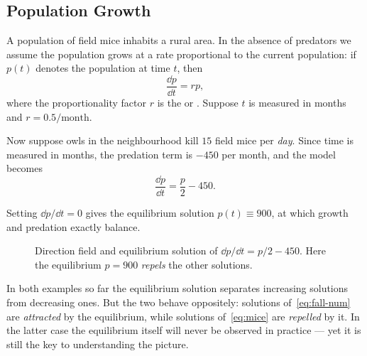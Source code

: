 \subsection{Population Growth}

\begin{eg}
	A population of field mice inhabits a rural area. In the absence of predators we
	assume the population grows at a rate proportional to the current population: if
	\(p(t)\) denotes the population at time \(t\), then
	\begin{equation}\label{eq:mice-basic}
		\frac{\dd p}{\dd t} = r p,
	\end{equation}
	where the proportionality factor \(r\) is the  or . Suppose \(t\) is measured in months and \(r = 0.5/\text{month}\).

	Now suppose owls in the neighbourhood kill \(15\) field mice per \emph{day}. Since
	time is measured in months, the predation term is \(-450\) per month, and the model
	becomes
	\begin{equation}\label{eq:mice}
		\frac{\dd p}{\dd t} = \frac{p}{2} - 450.
	\end{equation}
\end{eg}

Setting \(\dd p/\dd t = 0\) gives the equilibrium solution \(p(t) \equiv 900\), at which
growth and predation exactly balance.

\begin{figure}[H]
	\centering
	\caption{Direction field and equilibrium solution of
		\(\dd p/\dd t = p/2 - 450\). Here the equilibrium \(p = 900\) \emph{repels} the
		other solutions.}
	\label{fig:dirfield-mice}
\end{figure}

\begin{moral}
	In both examples so far the equilibrium solution separates increasing solutions from
	decreasing ones. But the two behave oppositely: solutions of~\eqref{eq:fall-num} are
	\emph{attracted} by the equilibrium, while solutions of~\eqref{eq:mice} are
	\emph{repelled} by it. In the latter case the equilibrium itself will never be
	observed in practice --- yet it is still the key to understanding the picture.
\end{moral}

